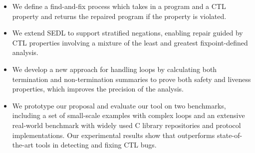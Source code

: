 \begin{itemize}[leftmargin=0.35cm]

\item 
We define a find-and-fix process which takes in a program and a CTL property and returns the repaired program if the property is violated.



\item We extend SEDL to support stratified negations, enabling repair guided by CTL properties involving a mixture of the least and greatest fixpoint-defined analysis. 


\item We develop a new approach for handling loops by calculating both termination and non-termination summaries to prove both safety and liveness properties, which improves the precision of the analysis. 




\item We prototype our proposal and evaluate our tool \toolName on two benchmarks, including a set of small-scale examples with complex loops and an extensive real-world benchmark with widely used C library repositories and protocol implementations. 
Our experimental results show that \toolName outperforms state-of-the-art tools in detecting and fixing CTL bugs. 

\end{itemize}


